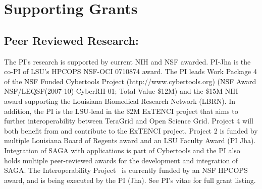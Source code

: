\documentclass[a4paper,10pt]{article}
\begin{document}


\section*{Supporting Grants}

\subsection{Peer Reviewed Research:} The PI's research is supported by current NIH and NSF awarded.  PI-Jha is the co-PI of LSU's HPCOPS NSF-OCI 0710874 award.  The PI leads Work Package 4 of the NSF Funded Cybertools Project (http://www.cybertools.org) (NSF Award NSF/LEQSF(2007-10)-CyberRII-01; Total Value \$12M) and the \$15M NIH award supporting the Louisiana Biomedical Research Network (LBRN).  In addition, the PI is the LSU-lead in the \$2M ExTENCI project that aims to further interoperability between TeraGrid and Open Science Grid.  Project 4 will both benefit from and contribute to the ExTENCI project.  Project 2 is funded by multiple Louisiana Board of Regents award and an LSU Faculty Award (PI Jha). Integration of SAGA with applications is part of Cybertools and the PI also holds multiple peer-reviewed awards for the development and integration of SAGA.  The Interoperability Project~\cite{interop_url} is currently funded by an NSF HPCOPS award, and is being executed by the PI (Jha).  See PI's vitae for full grant listing.
\end{document}
